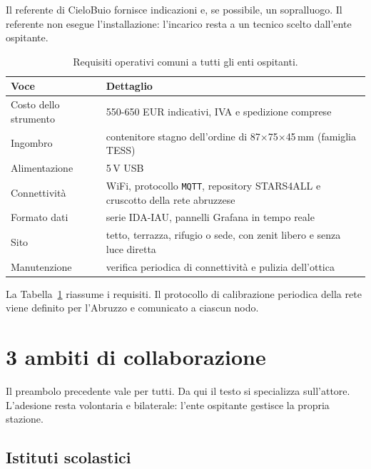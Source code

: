 \documentclass[11pt,a4paper]{report}
\begin{document}
Il referente di CieloBuio fornisce indicazioni e, se possibile, un sopralluogo. Il referente non esegue l'installazione: l'incarico resta a un tecnico scelto dall'ente ospitante.

\begin{table}[ht!]

\centering
\renewcommand{\arraystretch}{1.5}

\begin{tabularx}{\linewidth}{@{}l X@{}}
\toprule
Voce & Dettaglio \\
\midrule
Costo dello strumento & 550-650 EUR indicativi, IVA e spedizione comprese \\
Ingombro & contenitore stagno dell'ordine di 87$\times$75$\times$45\,mm (famiglia TESS) \\
Alimentazione & 5\,V USB \\
Connettività & WiFi, protocollo \texttt{MQTT}, repository STARS4ALL e cruscotto della rete abruzzese \\
Formato dati & serie IDA-IAU, pannelli Grafana in tempo reale \\
Sito & tetto, terrazza, rifugio o sede, con zenit libero e senza luce diretta \\
Manutenzione & verifica periodica di connettività e pulizia dell'ottica \\
\bottomrule
\end{tabularx}

\caption{Requisiti operativi comuni a tutti gli enti ospitanti.}
\label{tab:requisiti}
\end{table}

La Tabella~\ref{tab:requisiti} riassume i requisiti. Il protocollo di calibrazione periodica della rete viene definito per l'Abruzzo e comunicato a ciascun nodo.

\section*{3 ambiti di collaborazione}

Il preambolo precedente vale per tutti. Da qui il testo si specializza sull'attore. L'adesione resta volontaria e bilaterale: l'ente ospitante gestisce la propria stazione.

\subsection*{Istituti scolastici}
\end{document}

